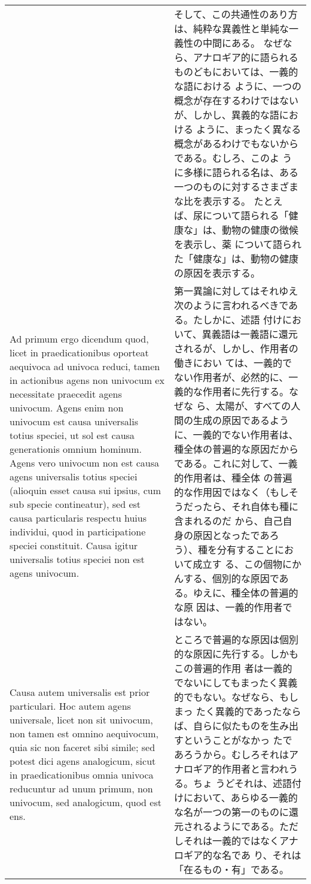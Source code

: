 \documentclass[10pt]{jsarticle} %
\begin{document}
\begin{longtable}{p{21em}p{21em}}
&


そして、この共通性のあり方は、純粋な異義性と単純な一義性の中間にある。
なぜなら、アナロギア的に語られるものどもにおいては、一義的な語における
ように、一つの概念が存在するわけではないが、しかし、異義的な語における
ように、まったく異なる概念があるわけでもないからである。むしろ、このよ
うに多様に語られる名は、ある一つのものに対するさまざまな比を表示する。
たとえば、尿について語られる「健康な」は、動物の健康の徴候を表示し、薬
について語られた「健康な」は、動物の健康の原因を表示する。

\\


{\sc Ad primum ergo dicendum} quod, licet in praedicationibus oporteat
aequivoca ad univoca reduci, tamen in actionibus agens non univocum ex
necessitate praecedit agens univocum. Agens enim non univocum est
causa universalis totius speciei, ut sol est causa generationis omnium
hominum. Agens vero univocum non est causa agens universalis totius
speciei (alioquin esset causa sui ipsius, cum sub specie contineatur),
sed est causa particularis respectu huius individui, quod in
participatione speciei constituit.  Causa igitur universalis totius
speciei non est agens univocum.

&

第一異論に対してはそれゆえ次のように言われるべきである。たしかに、述語
付けにおいて、異義語は一義語に還元されるが、しかし、作用者の働きにおい
ては、一義的でない作用者が、必然的に、一義的な作用者に先行する。なぜな
ら、太陽が、すべての人間の生成の原因であるように、一義的でない作用者は、
種全体の普遍的な原因だからである。これに対して、一義的作用者は、種全体
の普遍的な作用因ではなく（もしそうだったら、それ自体も種に含まれるのだ
から、自己自身の原因となったであろう）、種を分有することにおいて成立す
る、この個物にかんする、個別的な原因である。ゆえに、種全体の普遍的な原
因は、一義的作用者ではない。

\\

Causa autem universalis est prior particulari. Hoc autem agens
universale, licet non sit univocum, non tamen est omnino aequivocum,
quia sic non faceret sibi simile; sed potest dici agens analogicum,
sicut in praedicationibus omnia univoca reducuntur ad unum primum, non
univocum, sed analogicum, quod est ens.

&

ところで普遍的な原因は個別的な原因に先行する。しかもこの普遍的作用
者は一義的でないにしてもまったく異義的でもない。なぜなら、もしまっ
たく異義的であったならば、自らに似たものを生み出すということがなかっ
たであろうから。むしろそれはアナロギア的作用者と言われうる。ちょ
うどそれは、述語付けにおいて、あらゆる一義的な名が一つの第一のものに還
 元されるようにである。ただしそれは一義的ではなくアナロギア的な名であ
 り、それは「在るもの・有」である。


\end{longtable}
\end{document}
